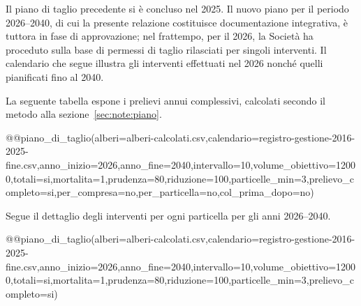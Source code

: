 Il piano di taglio precedente si è concluso nel 2025. Il nuovo piano per il
periodo 2026--2040, di cui la presente relazione costituisce documentazione
integrativa, è tuttora in fase di approvazione; nel frattempo, per il 2026, la
Società ha proceduto sulla base di permessi di taglio rilasciati per singoli
interventi. Il calendario che segue illustra gli interventi effettuati nel 2026
nonché quelli pianificati fino al 2040.

La seguente tabella espone i prelievi annui complessivi, calcolati secondo il metodo alla sezione~\ref{sec:note:piano}.

@@piano_di_taglio(alberi=alberi-calcolati.csv,calendario=registro-gestione-2016-2025-fine.csv,anno_inizio=2026,anno_fine=2040,intervallo=10,volume_obiettivo=12000,totali=si,mortalita=1,prudenza=80,riduzione=100,particelle_min=3,prelievo_completo=si,per_compresa=no,per_particella=no,col_prima_dopo=no)

Segue il dettaglio degli interventi per ogni particella per gli anni 2026--2040.

@@piano_di_taglio(alberi=alberi-calcolati.csv,calendario=registro-gestione-2016-2025-fine.csv,anno_inizio=2026,anno_fine=2040,intervallo=10,volume_obiettivo=12000,totali=si,mortalita=1,prudenza=80,riduzione=100,particelle_min=3,prelievo_completo=si)
